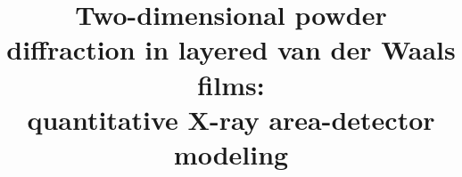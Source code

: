 \documentclass[12pt]{article}
\begin{document}
\title{Two-dimensional powder diffraction in layered van der Waals films:\\
quantitative X-ray area-detector modeling}
\author{}
\date{}
\maketitle











\end{document}
